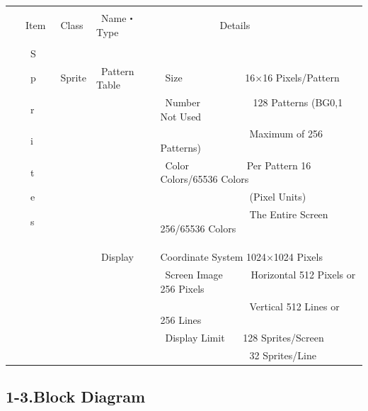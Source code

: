 \documentclass[twoside,a4paper,12pt]{article}
\begin{document}
\begin{tabular}{|p{17mm}|p{20mm}|p{27mm}|p{100mm}|}
\hline
& & &\\
\ \ \ Item & \ Class & \ Name・Type & \ \ \ \ \ \ \ \ \ \ \ \ Details\\[1mm]
\hline
& & &\\[-3mm]
\ \ \ \ S & & &\\[3mm]
\ \ \ \ p & \ Sprite & \ Pattern Table & \ Size \ \ \ \ \ \ \ \ \ \ \ \ 16×16 Pixels/Pattern\\[3mm]
\ \ \ \ r & & & \ Number \ \ \ \ \ \ \ \ \ \ 128 Patterns (BG0,1 Not Used\\[3mm]
\ \ \ \ i & & & \ \ \ \ \ \ \ \ \ \ \ \ \ \ \ \ \ \ Maximum of 256 Patterns)\\[3mm]
\ \ \ \ t & & & \ Color \ \ \ \ \ \ \ \ \ \ \ Per Pattern 16 Colors/65536 Colors\\[3mm]
\ \ \ \ e & & & \ \ \ \ \ \ \ \ \ \ \ \ \ \ \ \ \ \ (Pixel Units)\\[3mm]
\ \ \ \ s & & & \ \ \ \ \ \ \ \ \ \ \ \ \ \ \ \ \ \ The Entire Screen 256/65536 Colors\\
& & &\\
& & &\\
\cline{3-4}
& & &\\[-2mm]
& & \ Display & Coordinate System 1024×1024 Pixels\\[3mm]
& & & \ Screen Image \ \ \ \ \ Horizontal 512 Pixels or 256 Pixels\\[3mm]
& & & \ \ \ \ \ \ \ \ \ \ \ \ \ \ \ \ \ \ Vertical 512 Lines or 256 Lines\\[3mm]
& & & \ Display Limit \ \ \ 128 Sprites/Screen\\[3mm]
& & & \ \ \ \ \ \ \ \ \ \ \ \ \ \ \ \ \ \ 32 Sprites/Line\\
\hline
\end{tabular}

\newpage

\subsection*{1-3.Block Diagram}
\end{document}
